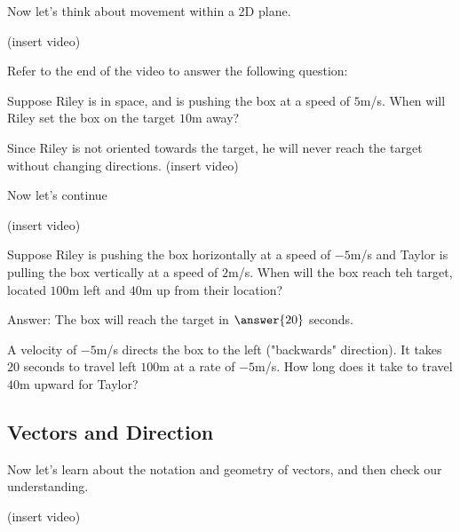 \documentclass{ximera}
\begin{document}
    Now let's think about movement within a 2D plane.

    (insert video)

\begin{problem}
    Refer to the end of the video to answer the following question:
    
    Suppose Riley is in space, and is pushing the box at a speed of $5$m/s. When will Riley set the box on the target $10$m away?
        \begin{multipleChoice}
        \end{multipleChoice}
    \begin{feedback}
        Since Riley is not oriented towards the target, he will never reach the target without changing directions.
        (insert video)
    \end{feedback}
\end{problem}

    Now let's continue

    (insert video)

\begin{problem}
    Suppose Riley is pushing the box horizontally at a speed of $-5$m/s and Taylor is pulling the box vertically at a speed of $2$m/s. When will the box reach teh target, located $100$m left and $40$m up from their location?

    Answer: The box will reach the target in $\answer{20}$ seconds.
    \begin{feedback}
    A velocity of $-5$m/s directs the box to the left ("backwards" direction). It takes $20$ seconds to travel left $100$m at a rate of $-5$m/s. How long does it take to travel $40$m upward for Taylor?
    \end{feedback}

\end{problem}

\subsection*{Vectors and Direction}

    Now let's learn about the notation and geometry of vectors, and then check our understanding.

    (insert video)
\end{document}
